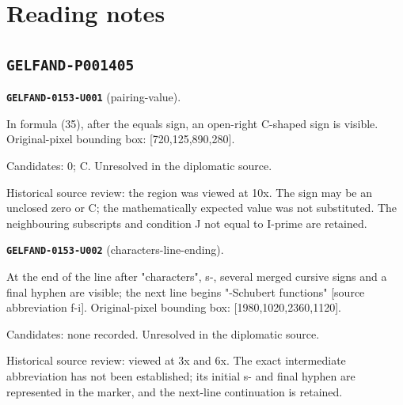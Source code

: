 \section*{Reading notes}
\subsection*{\texttt{GELFAND-P001405}}
\par\noindent\leavevmode{}\label{GELFAND-0153-U001}\textbf{\texttt{GELFAND-0153-U001}} (pairing-value).\nopagebreak[4]\par
In formula (35), after the equals sign, an open-right C-shaped sign is visible. Original-pixel bounding box: [720,125,890,280].\par
Candidates: 0; C. Unresolved in the diplomatic source.\par
Historical source review: the region was viewed at 10x. The sign may be an unclosed zero or C; the mathematically expected value was not substituted. The neighbouring subscripts and condition J not equal to I-prime are retained.\par\medskip
\par\noindent\leavevmode{}\label{GELFAND-0153-U002}\textbf{\texttt{GELFAND-0153-U002}} (characters-line-ending).\nopagebreak[4]\par
At the end of the line after "characters", s-, several merged cursive signs and a final hyphen are visible; the next line begins "-Schubert functions" [source abbreviation f-i]. Original-pixel bounding box: [1980,1020,2360,1120].\par
Candidates: none recorded. Unresolved in the diplomatic source.\par
Historical source review: viewed at 3x and 6x. The exact intermediate abbreviation has not been established; its initial s- and final hyphen are represented in the marker, and the next-line continuation is retained.\par\medskip
